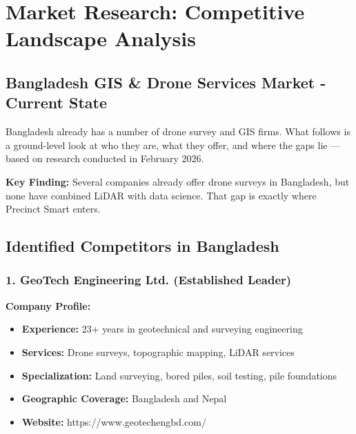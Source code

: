 
\chapter*{Market Research: Competitive Landscape Analysis}

\section{Bangladesh GIS \& Drone Services Market - Current State}

Bangladesh already has a number of drone survey and GIS firms. What follows is a ground-level look at who they are, what they offer, and where the gaps lie — based on research conducted in February 2026.

\begin{importantbox}
    \textbf{Key Finding:} Several companies already offer drone surveys in Bangladesh, but none have combined LiDAR with data science. That gap is exactly where Precinct Smart enters.
\end{importantbox}

\section{Identified Competitors in Bangladesh}

\subsection{1. GeoTech Engineering Ltd. (Established Leader)}

\textbf{Company Profile:}
\begin{itemize}
    \item \textbf{Experience:} 23+ years in geotechnical and surveying engineering
    \item \textbf{Services:} Drone surveys, topographic mapping, LiDAR services
    \item \textbf{Specialization:} Land surveying, bored piles, soil testing, pile foundations
    \item \textbf{Geographic Coverage:} Bangladesh and Nepal
    \item \textbf{Website:} https://www.geotechengbd.com/
\end{itemize}

